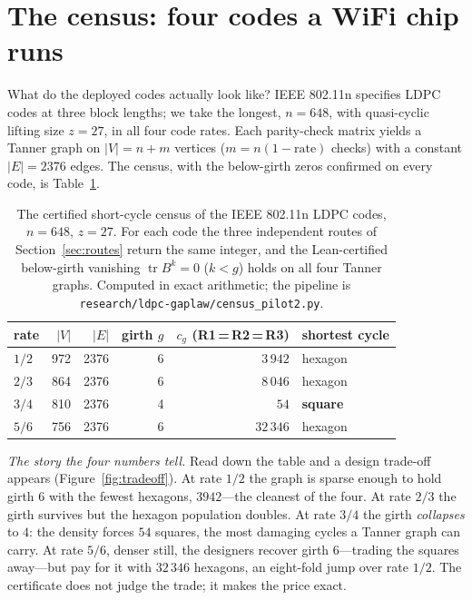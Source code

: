 \documentclass[11pt]{article}
\newcommand{\lean}[1]{\texttt{#1}}
\DeclareMathOperator{\tr}{tr}
\begin{document}
\section{The census: four codes a WiFi chip runs}
\label{sec:census}

What do the deployed codes actually look like? IEEE 802.11n specifies LDPC codes at three
block lengths; we take the longest, $n = 648$, with quasi-cyclic lifting size $z = 27$, in
all four code rates. Each parity-check matrix yields a Tanner graph on $|V| = n + m$ vertices
($m = n(1-\text{rate})$ checks) with a constant $|E| = 2376$ edges. The census, with the
below-girth zeros confirmed on every code, is Table~\ref{tab:census}.

\begin{table}[h]
\centering\small
{}
\begin{tabular}{@{}lrrrrl@{}}
\toprule
\rowcolor{ggteal!18} rate & $|V|$ & $|E|$ & girth $g$ & $c_g$ (R1\,=\,R2\,=\,R3) & shortest cycle \\
\midrule
$1/2$ & 972 & 2376 & 6 & $3\,942$  & hexagon \\
$2/3$ & 864 & 2376 & 6 & $8\,046$  & hexagon \\
$3/4$ & 810 & 2376 & 4 & $54$      & \textbf{square} \\
$5/6$ & 756 & 2376 & 6 & $32\,346$ & hexagon \\
\bottomrule
\end{tabular}
\caption{The certified short-cycle census of the IEEE 802.11n LDPC codes, $n = 648$,
$z = 27$. For each code the three independent routes of Section~\ref{sec:routes} return the
same integer, and the Lean-certified below-girth vanishing $\tr B^k = 0$ ($k < g$) holds on
all four Tanner graphs. Computed in exact arithmetic; the pipeline is
\lean{research/ldpc-gaplaw/census\_pilot2.py}.}
\label{tab:census}
\end{table}

\emph{The story the four numbers tell.} Read down the table and a design trade-off appears
(Figure~\ref{fig:tradeoff}). At rate $1/2$ the graph is sparse enough to hold girth $6$ with
the fewest hexagons, $3942$---the cleanest of the four. At rate $2/3$ the girth survives but
the hexagon population doubles. At rate $3/4$ the girth \emph{collapses} to $4$: the density
forces $54$ squares, the most damaging cycles a Tanner graph can carry. At rate $5/6$, denser
still, the designers recover girth $6$---trading the squares away---but pay for it with
$32\,346$ hexagons, an eight-fold jump over rate $1/2$. The certificate does not judge the
trade; it makes the price exact.
\end{document}
